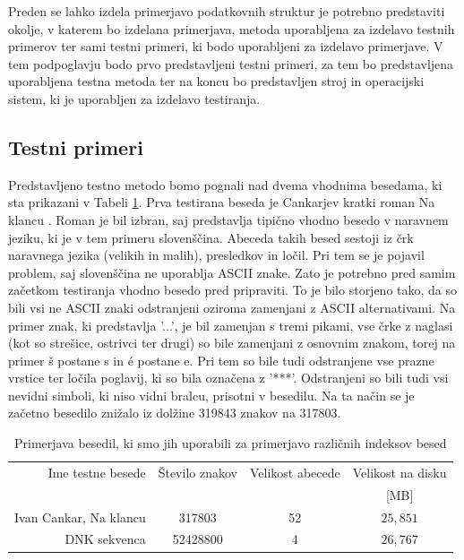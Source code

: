 Preden se lahko izdela primerjavo podatkovnih struktur je potrebno predstaviti okolje, v katerem bo izdelana primerjava, metoda uporabljena za izdelavo testnih primerov ter sami testni primeri, ki bodo uporabljeni za izdelavo primerjave. V tem podpoglavju bodo prvo predstavljeni testni primeri, za tem bo predstavljena uporabljena testna metoda ter na koncu bo predstavljen stroj in operacijski sistem, ki je uporabljen za izdelavo testiranja. 

\subsection{Testni primeri}

Predstavljeno testno metodo bomo pognali nad dvema vhodnima besedama, ki sta prikazani v Tabeli \ref{tab:besedila}. Prva testirana beseda je Cankarjev kratki roman Na klancu \cite{podatkiNaKlancu}. Roman je bil izbran, saj predstavlja tipično vhodno besedo v naravnem jeziku, ki je v tem primeru slovenščina. Abeceda takih besed sestoji iz črk naravnega jezika (velikih in malih), presledkov in ločil. Pri tem se je pojavil problem, saj slovenščina ne uporablja ASCII znake. Zato je potrebno pred samim začetkom testiranja vhodno besedo pred pripraviti. To je bilo storjeno tako, da so bili vsi ne ASCII znaki odstranjeni oziroma zamenjani z ASCII alternativami. Na primer znak, ki predstavlja '...', je bil zamenjan s tremi pikami, vse črke z naglasi (kot so strešice, ostrivci ter drugi) so bile zamenjani z osnovnim znakom, torej na primer š postane s in é postane e. Pri tem so bile tudi odstranjene vse prazne vrstice ter ločila poglavij, ki so bila označena z '***'. Odstranjeni so bili tudi vsi nevidni simboli, ki niso vidni bralcu, prisotni v besedilu. Na ta način se je začetno besedilo znižalo iz dolžine 319843 znakov na 317803.

\begin{table}[htb]
    \caption{Primerjava besedil, ki smo jih uporabili za primerjavo različnih indeksov besed}
    \label{tab:besedila}
    \centering
    \begin{tabular}{rccc}
        Ime testne besede& Število znakov & Velikost abecede & Velikost na disku \\
        &  &   & [MB]\\
         \hline
        Ivan Cankar, Na klancu \cite{podatkiNaKlancu}& 317803 & 52 & $25,851$ \\
        DNK sekvenca \cite{podatki}&  52428800& 4 & $26,767$ \\
    \end{tabular}    
\end{table}

